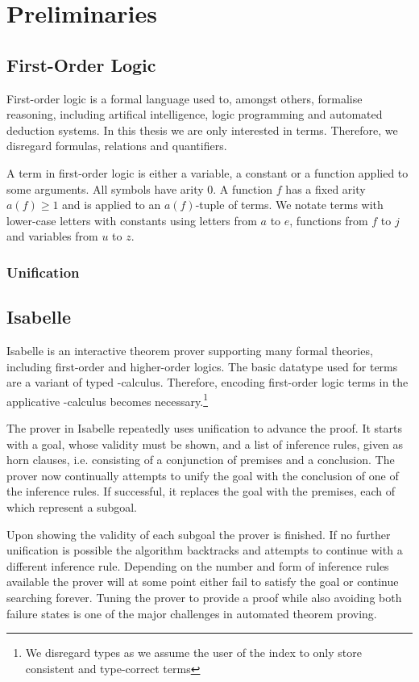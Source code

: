 \chapter{Preliminaries}
\section{First-Order Logic}
First-order logic is a formal language used to, amongst others, formalise reasoning, including artifical intelligence, logic programming and automated deduction systems. In this thesis we are only interested in terms. Therefore, we disregard formulas, relations and quantifiers.

A term in first-order logic is either a variable, a constant or a function applied to some arguments. All symbols have arity $0$. A function $f$ has a fixed arity $a(f) \geq 1$ and is applied to an $a(f)$-tuple of terms. We notate terms with lower-case letters with constants using letters from $a$ to $e$, functions from $f$ to $j$ and variables from $u$ to $z$.

\subsection{Unification}
\todo{}

\section{Isabelle}
Isabelle is an interactive theorem prover supporting many formal theories, including first-order and higher-order logics. The basic datatype used for terms are a variant of typed \lam -calculus. Therefore, encoding first-order logic terms in the applicative \lam -calculus becomes necessary.\footnote{We disregard types as we assume the user of the index to only store consistent and type-correct terms}

The prover in Isabelle repeatedly uses unification to advance the proof. It starts with a goal, whose validity must be shown, and a list of inference rules, given as horn clauses, i.e. consisting of a conjunction of premises and a conclusion. The prover now continually attempts to unify the goal with the conclusion of one of the inference rules. If successful, it replaces the goal with the premises, each of which represent a subgoal.

Upon showing the validity of each subgoal the prover is finished. If no further unification is possible the algorithm backtracks and attempts to continue with a different inference rule. Depending on the number and form of inference rules available the prover will at some point either fail to satisfy the goal or continue searching forever. Tuning the prover to provide a proof while also avoiding both failure states is one of the major challenges in automated theorem proving.\cite{paulson_isabelle_nodate}

